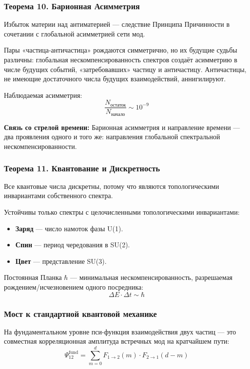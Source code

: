 \documentclass[12pt,a4paper]{article}
\begin{document}
\subsubsection{Теорема 10. Барионная Асимметрия}
Избыток материи над антиматерией --- следствие Принципа Причинности в сочетании с глобальной асимметрией сети мод.

Пары «частица-античастица» рождаются симметрично, но их будущие судьбы различны: глобальная нескомпенсированность спектров создаёт асимметрию в числе будущих событий, «затребовавших» частицу и античастицу. Античастицы, не имеющие достаточного числа будущих взаимодействий, аннигилируют.

Наблюдаемая асимметрия:
\begin{equation}
    \frac{N_{\text{остаток}}}{N_{\text{начало}}} \sim 10^{-9}
\end{equation}

\textbf{Связь со стрелой времени:} Барионная асимметрия и направление времени --- два проявления одного и того же: направления глобальной спектральной нескомпенсированности.

\subsubsection{Теорема 11. Квантование и Дискретность}
Все квантовые числа дискретны, потому что являются топологическими инвариантами собственного спектра.

Устойчивы только спектры с целочисленными топологическими инвариантами:
\begin{itemize}
    \item \textbf{Заряд} --- число намоток фазы U(1).
    \item \textbf{Спин} --- период чередования в SU(2).
    \item \textbf{Цвет} --- представление SU(3).
\end{itemize}

Постоянная Планка $\hbar$ --- минимальная нескомпенсированность, разрешаемая рождением/исчезновением одного посредника:
\begin{equation}
    \Delta E \cdot \Delta t \sim \hbar
\end{equation}

\subsubsection{Мост к стандартной квантовой механике}
На фундаментальном уровне пси-функция взаимодействия двух частиц --- это совместная корреляционная амплитуда встречных мод на кратчайшем пути:
\begin{equation}
    \Psi_{12}^{\text{fund}} = \sum_{m=0}^{d} F_{1 \to 2}(m) \cdot F_{2 \to 1}(d-m)
\end{equation}
\end{document}
